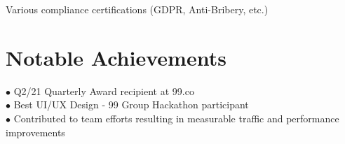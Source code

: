 \documentclass[a4paper, 11pt]{article}
\begin{document}
\begin{itemize}[leftmargin=0.15in, label={}]
    \small{\item{Various compliance certifications (GDPR, Anti-Bribery, etc.)}}
\end{itemize}

\section{Notable Achievements}
\begin{itemize}[leftmargin=0.15in, label={}]
    \small{\item{
     $\bullet$ Q2/21 Quarterly Award recipient at 99.co \\
     $\bullet$ Best UI/UX Design - 99 Group Hackathon participant \\
     $\bullet$ Contributed to team efforts resulting in measurable traffic and performance improvements
    }}
\end{itemize}
\end{document}
